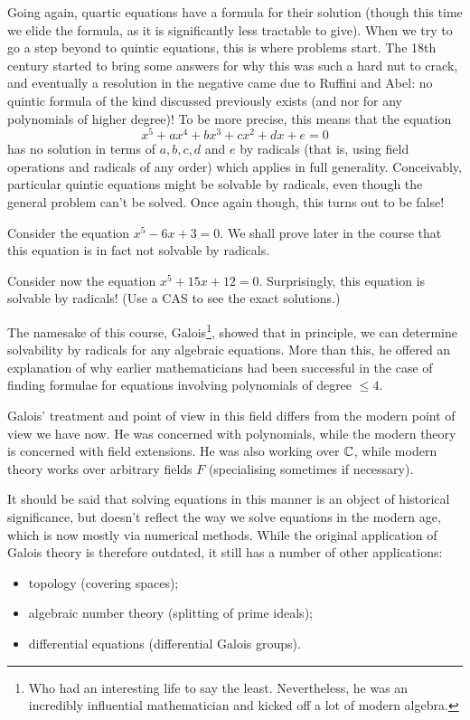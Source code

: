 Going again, quartic equations have a formula for their solution (though this time we elide the formula, as it is significantly less tractable to give). When we try to go a step beyond to quintic equations, this is where problems start. The 18th century started to bring some answers for why this was such a hard nut to crack, and eventually a resolution in the negative came due to Ruffini and Abel: no quintic formula of the kind discussed previously exists (and nor for any polynomials of higher degree)! To be more precise, this means that the equation
\[
    x^5 + ax^4 + bx^3 + cx^2 + dx + e = 0
\]
has no solution in terms of $a, b, c, d$ and $e$ by radicals (that is, using field operations and radicals of any order) which applies in full generality. Conceivably, particular quintic equations might be solvable by radicals, even though the general problem can't be solved. Once again though, this turns out to be false!

\begin{example}
    Consider the equation $x^5 - 6x + 3 = 0$. We shall prove later in the course that this equation is in fact not solvable by radicals.
\end{example}

\begin{example}
    Consider now the equation $x^5 + 15x + 12 = 0$. Surprisingly, this equation is solvable by radicals! (Use a CAS to see the exact solutions.)
\end{example}

The namesake of this course, Galois\footnote{Who had an interesting life to say the least. Nevertheless, he was an incredibly influential mathematician and kicked off a lot of modern algebra.}, showed that in principle, we can determine solvability by radicals for any algebraic equations. More than this, he offered an explanation of why earlier mathematicians had been successful in the case of finding formulae for equations involving polynomials of degree $\leq 4$.

Galois' treatment and point of view in this field differs from the modern point of view we have now. He was concerned with polynomials, while the modern theory is concerned with field extensions. He was also working over $\mathbb{{C}}$, while modern theory works over arbitrary fields $F$ (specialising sometimes if necessary).

It should be said that solving equations in this manner is an object of historical significance, but doesn't reflect the way we solve equations in the modern age, which is now mostly via numerical methods. While the original application of Galois theory is therefore outdated, it still has a number of other applications:
\begin{itemize}
    \item topology (covering spaces);
    \item algebraic number theory (splitting of prime ideals);
    \item differential equations (differential Galois groups).
\end{itemize}

